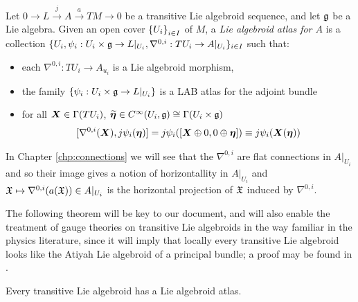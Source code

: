 \begin{definition}%
Let $0 \to L \xrightarrow{j} A \xrightarrow{a} TM \to 0$ be a transitive Lie algebroid sequence, and let $\mathfrak{g}$ be a Lie algebra. Given an open cover $\left\{ U_i \right\}_{i \in I}$ of $M$, a \emph{Lie algebroid atlas for $A$} is a collection $\{U_i, \psi_i:U_i \times \mathfrak{g} \to L|_{U_i}, \nabla^{0,i}: TU_i \to A|_{U_i}\}_{i \in I}$ such that:
    \begin{itemize}
    
    \item each $\nabla^{0,i}: TU_i \to A_{u_i}$ is a Lie algebroid morphism,
    
    \item the family $\left\{ \psi_i:U_i \times \mathfrak{g} \to L|_{U_i} \right\}$ is a LAB atlas for the adjoint bundle 
    
    \item for all $\bm{X} \in \Gamma(TU_i)$, $\widetilde{\bm{\eta}} \in C^\infty(U_i, \mathfrak{g}) \cong \Gamma(U_i \times \mathfrak{g})$
        \begin{align} \label{eqnCompLocal}
            [\nabla^{0,i}(\bm{X}), j\psi_i(\bm{\eta})] = j\psi_i([\bm{X} \oplus 0, 0 \oplus \bm{\eta}]) \equiv j\psi_i(\bm{X}(\bm{\eta})) 
        \end{align}
    
    \end{itemize}
\end{definition}
In Chapter \ref{chp:connections} we will see that the $\nabla^{0,i}$ are flat connections in $A|_{U_i}$ and so their image gives a notion of horizontallity in $A|_{U_i}$ and $ \mathfrak{X} \mapsto \nabla^{0,i}(a(\mathfrak{X})) \in A|_{U_i}$ is the horizontal projection of $\mathfrak{X}$ induced by $\nabla^{0,i}$.

The following theorem will be key to our document, and will also enable the treatment of gauge theories on transitive Lie algebroids in the way familiar in the physics literature, since it will imply that locally every transitive Lie algebroid looks like the Atiyah Lie algebroid of a principal bundle; a proof may be found in \cite{Mackenzie2005}.
\begin{theorem}\label{theoremTransitiveHasAtlasLocallyTrivial}
Every transitive Lie algebroid has a Lie algebroid atlas.
\end{theorem}

